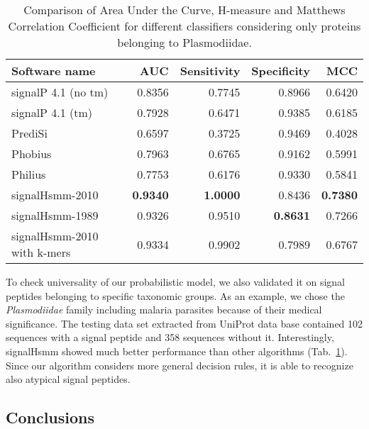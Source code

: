 \documentclass[10pt,letterpaper]{article}
\begin{document}
\begin{table}[ht]
\centering
\caption{Comparison of Area Under the Curve, H-measure and Matthews Correlation Coefficient for different classifiers considering only proteins belonging to Plasmodiidae.} 
\begin{tabular}{lrrrr}
  \toprule
Software name & AUC & Sensitivity & Specificity & MCC \\ 
  \midrule
signalP 4.1 (no tm) \cite{2011petersensignalp} & 0.8356 & 0.7745 & 0.8966 & 0.6420 \\ 
   \rowcolor[gray]{0.85}signalP 4.1 (tm) \cite{2011petersensignalp} & 0.7928 & 0.6471 & 0.9385 & 0.6185 \\ 
  PrediSi \cite{2004hillerpredisi} & 0.6597 & 0.3725 & 0.9469 & 0.4028 \\ 
   \rowcolor[gray]{0.85}Phobius \cite{2004klla} & 0.7963 & 0.6765 & 0.9162 & 0.5991 \\ 
  Philius \cite{2008reynoldstransmembrane} & 0.7753 & 0.6176 & 0.9330 & 0.5841 \\ 
   \rowcolor[gray]{0.85}signalHsmm-2010 & \textbf{0.9340} & \textbf{1.0000} & 0.8436 & \textbf{0.7380} \\ 
  signalHsmm-1989 & 0.9326 & 0.9510 & \textbf{0.8631} & 0.7266 \\ 
   \rowcolor[gray]{0.85}signalHsmm-2010 with k-mers & 0.9334 & 0.9902 & 0.7989 & 0.6767 \\ 
   \bottomrule
\end{tabular}
\label{tab:bench2010plas}
\end{table}

To check universality of our probabilistic model, we also validated it on signal peptides belonging to specific taxonomic groups. As an example, we chose the \textit{Plasmodiidae} family including malaria parasites because of their medical significance. The testing data set extracted from UniProt data base contained 102 sequences with a signal peptide and 358 sequences without it. Interestingly, signalHsmm showed much better performance than other algorithms (Tab.~\ref{tab:bench2010plas}). Since our algorithm considers more general decision rules, it is able to recognize also atypical signal peptides.


\subsection*{Conclusions}
\end{document}
